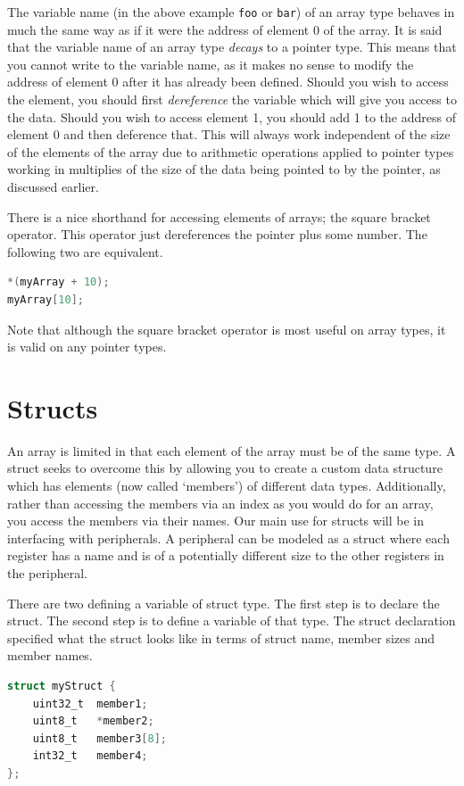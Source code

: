 The variable name (in the above example \texttt{foo} or \texttt{bar}) of an array type behaves in much the same way as if it were the address of element 0 of the array. 
It is said that the variable name of an array type \emph{decays} to a pointer type.
This means that you cannot write to the variable name, as it makes no sense to modify the address of element 0 after it has already been defined. 
Should you wish to access the element, you should first \emph{dereference} the variable which will give you access to the data. 
Should you wish to access element 1, you should add 1 to the address of element 0 and then deference that. 
This will always work independent of the size of the elements of the array due to arithmetic operations applied to pointer types working in multiplies of the size of the data being pointed to by the pointer, as discussed earlier.

There is a nice shorthand for accessing elements of arrays; the square bracket operator. This operator just dereferences the pointer plus some number. The following two are equivalent. 
\begin{lstlisting}[language=C]
*(myArray + 10);
myArray[10];
\end{lstlisting}

Note that although the square bracket operator is most useful on array types, it is valid on any pointer types. 

\section{Structs}
An array is limited in that each element of the array must be of the same type. A struct seeks to overcome this by allowing you to create a custom data structure which has elements (now called `members') of different data types. Additionally, rather than accessing the members via an index as you would do for an array, you access the members via their names. 
Our main use for structs will be in interfacing with peripherals.
A peripheral can be modeled as a struct where each register has a name and is of a potentially different size to the other registers in the peripheral.

There are two defining a variable of struct type.
The first step is to declare the struct. The second step is to define a variable of that type.
The struct declaration specified what the struct looks like in terms of struct name, member sizes and member names.

\begin{lstlisting}[language=C]
struct myStruct {
    uint32_t  member1;
    uint8_t   *member2;
    uint8_t   member3[8];
    int32_t   member4; 
};
\end{lstlisting}

